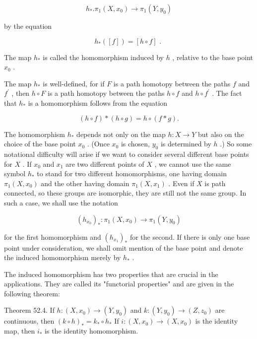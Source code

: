 \[
{h}_{ * }.{\pi }_{1}\left( {X,{x}_{0}}\right)  \rightarrow  {\pi }_{1}\left( {Y,{y}_{0}}\right)
\]

by the equation

\[
{h}_{ * }\left( \left\lbrack  f\right\rbrack  \right)  = \left\lbrack  {h \circ  f}\right\rbrack  \text{ . }
\]

The map \({h}_{ * }\) is called the homomorphism induced by \(h\) , relative to the base point \({x}_{0}\) .

The map \({h}_{ * }\) is well-defined, for if \(F\) is a path homotopy between the paths \(f\) and \({f}^{\prime }\) , then \(h \circ  F\) is a path homotopy between the paths \(h \circ  f\) and \(h \circ  {f}^{\prime }\) . The fact that \({h}_{ * }\) is a homomorphism follows from the equation

\[
\left( {h \circ  f}\right)  * \left( {h \circ  g}\right)  = h \circ  \left( {f * g}\right) .
\]

The homomorphism \({h}_{ * }\) depends not only on the map \(h : X \rightarrow  Y\) but also on the choice of the base point \({x}_{0}\) . (Once \({x}_{0}\) is chosen, \({y}_{0}\) is determined by \(h\) .) So some notational difficulty will arise if we want to consider several different base points for \(X\) . If \({x}_{0}\) and \({x}_{1}\) are two different points of \(X\) , we cannot use the same symbol \({h}_{ * }\) to stand for two different homomorphisms, one having domain \({\pi }_{1}\left( {X,{x}_{0}}\right)\) and the other having domain \({\pi }_{1}\left( {X,{x}_{1}}\right)\) . Even if \(X\) is path connected, so these groups are isomorphic, they are still not the same group. In such a case, we shall use the notation

\[
{\left( {h}_{{x}_{0}}\right) }_{ * } : {\pi }_{1}\left( {X,{x}_{0}}\right)  \rightarrow  {\pi }_{1}\left( {Y,{y}_{0}}\right)
\]

for the first homomorphism and \({\left( {h}_{{x}_{1}}\right) }_{ * }\) for the second. If there is only one base point under consideration, we shall omit mention of the base point and denote the induced homomorphism merely by \({h}_{ * }\) .

The induced homomorphism has two properties that are crucial in the applications. They are called its "functorial properties" and are given in the following theorem:

Theorem 52.4. If \(h : \left( {X,{x}_{0}}\right)  \rightarrow  \left( {Y,{y}_{0}}\right)\) and \(k : \left( {Y,{y}_{0}}\right)  \rightarrow  \left( {Z,{z}_{0}}\right)\) are continuous, then \({\left( k \circ  h\right) }_{ * } = {k}_{ * } \circ  {h}_{ * }\) If \(i : \left( {X,{x}_{0}}\right)  \rightarrow  \left( {X,{x}_{0}}\right)\) is the identity map, then \({i}_{ * }\) is the identity homomorphism.

